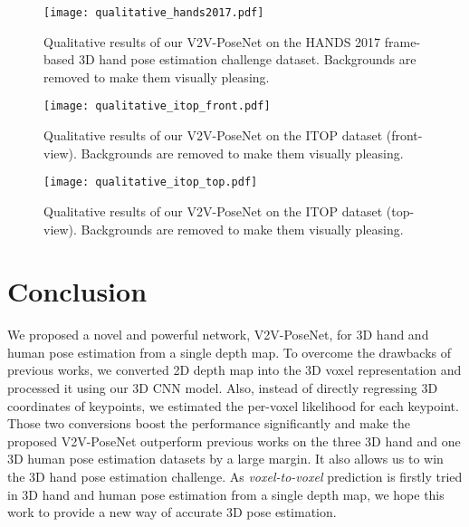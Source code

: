 \documentclass[10pt,twocolumn,letterpaper]{article}
\begin{document}
\begin{figure*}
\begin{center}
   \texttt{[image: qualitative\_hands2017.pdf]}
\end{center}
\vspace*{-6mm}
   \caption{Qualitative results of our V2V-PoseNet on the HANDS 2017 frame-based 3D hand pose estimation challenge dataset. Backgrounds are removed to make them visually pleasing.}
\vspace*{-3mm}
\label{fig:qualitative_hands2017}
\end{figure*}

\begin{figure*}
\begin{center}
   \texttt{[image: qualitative\_itop\_front.pdf]}
\end{center}
\vspace*{-6mm}
   \caption{Qualitative results of our V2V-PoseNet on the ITOP dataset (front-view). Backgrounds are removed to make them visually pleasing.}
\vspace*{-3mm}
\label{fig:qualitative_itop_front}
\end{figure*}

\begin{figure*}
\begin{center}
   \texttt{[image: qualitative\_itop\_top.pdf]}
\end{center}
\vspace*{-6mm}
   \caption{Qualitative results of our V2V-PoseNet on the ITOP dataset (top-view). Backgrounds are removed to make them visually pleasing.}
\vspace*{-3mm}
\label{fig:qualitative_itop_top}
\end{figure*} \section{Conclusion}
We proposed a novel and powerful network, V2V-PoseNet, for 3D hand and human pose estimation from a single depth map. To overcome the drawbacks of previous works, we converted 2D depth map into the 3D voxel representation and processed it using our 3D CNN model. Also, instead of directly regressing 3D coordinates of keypoints, we estimated the per-voxel likelihood for each keypoint. Those two conversions boost the performance significantly and make the proposed V2V-PoseNet outperform previous works on the three 3D hand and one 3D human pose estimation datasets by a large margin. It also allows us to win the 3D hand pose estimation challenge. As \emph{voxel-to-voxel} prediction is firstly tried in 3D hand and human pose estimation from a single depth map, we hope this work to provide a new way of accurate 3D pose estimation. 
\clearpage
\clearpage

{\small


}
\end{document}
